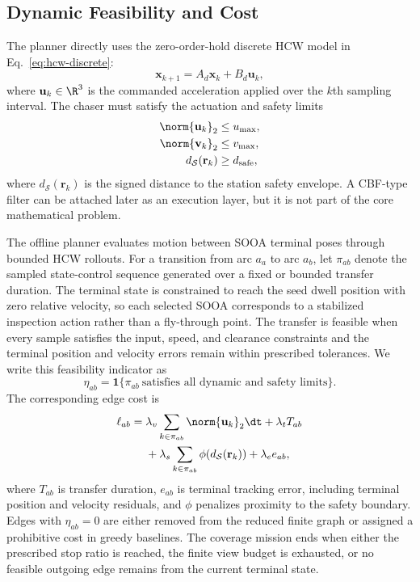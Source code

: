 \subsection{Dynamic Feasibility and Cost}

The planner directly uses the zero-order-hold discrete HCW model in
Eq.~\eqref{eq:hcw-discrete}:
\begin{equation}
  \mathbf{x}_{k+1}=A_d\mathbf{x}_k+B_d\mathbf{u}_k,
\end{equation}
where $\mathbf{u}_k\in\R^3$ is the commanded acceleration applied over the
$k$th sampling interval. The chaser must satisfy the
actuation and safety limits
\begin{align}
  \norm{\mathbf{u}_k}_2 &\le u_{\max}, \\
  \norm{\mathbf{v}_k}_2 &\le v_{\max}, \\
  d_{\mathcal S}(\mathbf{r}_k) &\ge d_{\mathrm{safe}},
\end{align}
where $d_{\mathcal S}(\mathbf{r}_k)$ is the signed distance to the station safety
envelope. A CBF-type filter can be attached later as an execution layer, but
it is not part of the core mathematical problem.

The offline planner evaluates motion between SOOA terminal poses through
bounded HCW rollouts. For a transition from arc $a_a$ to arc $a_b$, let
$\pi_{ab}$ denote the sampled state-control sequence generated over a fixed or
bounded transfer duration. The terminal state is constrained to reach the seed
dwell position with zero relative velocity, so each selected SOOA corresponds
to a stabilized inspection action rather than a fly-through point.
The transfer is feasible when every sample satisfies the input, speed, and
clearance constraints and the terminal position and velocity errors remain
within prescribed tolerances. We write this feasibility indicator as
\begin{equation}
  \eta_{ab} =
  \mathbf{1}\{\pi_{ab}\ \text{satisfies all dynamic and safety limits}\}.
\end{equation}
The corresponding edge cost is
\begin{equation}
  \begin{aligned}
  \ell_{ab} ={}&
  \lambda_v \sum_{k\in\pi_{ab}}\norm{\mathbf{u}_k}_2\dt
  + \lambda_t T_{ab} \\
  &+ \lambda_s \sum_{k\in\pi_{ab}}\phi(d_{\mathcal S}(\mathbf{r}_k))
  + \lambda_e e_{ab},
  \end{aligned}
\end{equation}
where $T_{ab}$ is transfer duration, $e_{ab}$ is terminal tracking error,
including terminal position and velocity residuals, and $\phi$ penalizes
proximity to the safety boundary. Edges with $\eta_{ab}=0$
are either removed from the reduced finite graph or assigned a prohibitive cost
in greedy baselines.
The coverage mission ends when either the prescribed stop ratio is
reached, the finite view budget is exhausted, or no feasible outgoing edge
remains from the current terminal state.


